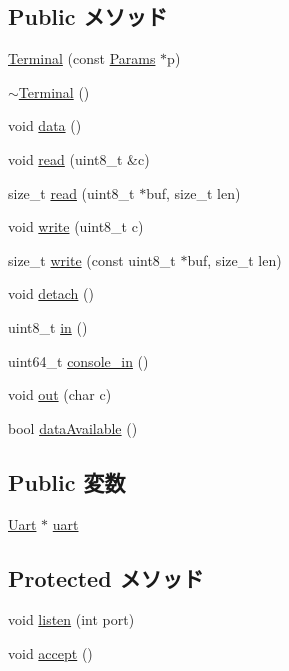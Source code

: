 \subsection*{Public メソッド}
\begin{DoxyCompactItemize}
\item 
\hyperlink{classTerminal_af67625ef23fe68d37a4fc8536c093b9f}{Terminal} (const \hyperlink{classTerminal_aa60a1659eb9e560503e47d6cbedd5ace}{Params} $\ast$p)
\item 
\hyperlink{classTerminal_a8495caff1d8ed60c107a562c9ceccbf3}{$\sim$Terminal} ()
\item 
void \hyperlink{classTerminal_a6617ba3e856d8b24979a2a44e5417172}{data} ()
\item 
void \hyperlink{classTerminal_ad584a0aa9613e91193e6d6649bf6c171}{read} (uint8\_\-t \&c)
\item 
size\_\-t \hyperlink{classTerminal_a9f8a094b410fa145da19663f83f241e3}{read} (uint8\_\-t $\ast$buf, size\_\-t len)
\item 
void \hyperlink{classTerminal_ada436a4b74c69ffbd4dc02b4b03d2cd3}{write} (uint8\_\-t c)
\item 
size\_\-t \hyperlink{classTerminal_a215d71301eb6ae0ebffc5d2f8fe4a140}{write} (const uint8\_\-t $\ast$buf, size\_\-t len)
\item 
void \hyperlink{classTerminal_ac295bade8aee589f6718dfa79edc2a34}{detach} ()
\item 
uint8\_\-t \hyperlink{classTerminal_a4200167e7f31117dce374e1885e36b1e}{in} ()
\item 
uint64\_\-t \hyperlink{classTerminal_abd9097353ba2e3b0552d2b731196e74a}{console\_\-in} ()
\item 
void \hyperlink{classTerminal_acc9adc1d382d03684010f95ae14318d4}{out} (char c)
\item 
bool \hyperlink{classTerminal_ae2c49c57a81bf30ab522f0eb98a45035}{dataAvailable} ()
\end{DoxyCompactItemize}
\subsection*{Public 変数}
\begin{DoxyCompactItemize}
\item 
\hyperlink{classUart}{Uart} $\ast$ \hyperlink{classTerminal_a367b890cb271162bf5e8d879e09192cf}{uart}
\end{DoxyCompactItemize}
\subsection*{Protected メソッド}
\begin{DoxyCompactItemize}
\item 
void \hyperlink{classTerminal_ac0c44c1417536740ffc2cf33117027cf}{listen} (int port)
\item 
void \hyperlink{classTerminal_aadb9f3b844fb4cf98288cd3c60a3af91}{accept} ()
\end{DoxyCompactItemize}
